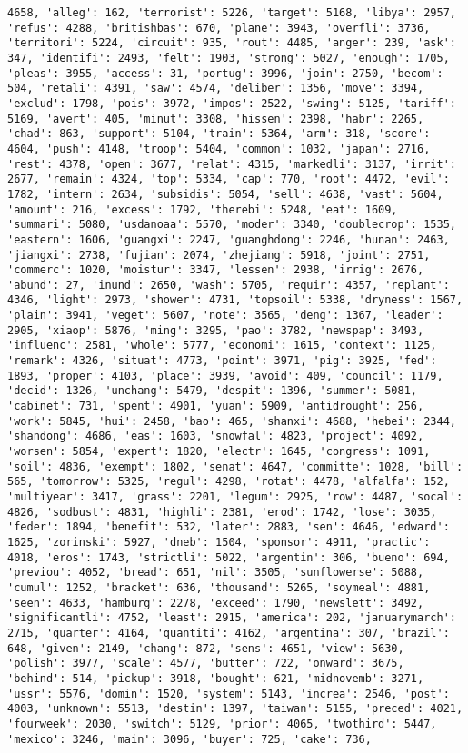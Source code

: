 \documentclass[11pt]{article}
\begin{document}
\begin{Verbatim}[commandchars=\\\{\}]
4658, 'alleg': 162, 'terrorist': 5226, 'target': 5168, 'libya': 2957, 'refus': 4288, 'britishbas': 670, 'plane': 3943, 'overfli': 3736, 'territori': 5224, 'circuit': 935, 'rout': 4485, 'anger': 239, 'ask': 347, 'identifi': 2493, 'felt': 1903, 'strong': 5027, 'enough': 1705, 'pleas': 3955, 'access': 31, 'portug': 3996, 'join': 2750, 'becom': 504, 'retali': 4391, 'saw': 4574, 'deliber': 1356, 'move': 3394, 'exclud': 1798, 'pois': 3972, 'impos': 2522, 'swing': 5125, 'tariff': 5169, 'avert': 405, 'minut': 3308, 'hissen': 2398, 'habr': 2265, 'chad': 863, 'support': 5104, 'train': 5364, 'arm': 318, 'score': 4604, 'push': 4148, 'troop': 5404, 'common': 1032, 'japan': 2716, 'rest': 4378, 'open': 3677, 'relat': 4315, 'markedli': 3137, 'irrit': 2677, 'remain': 4324, 'top': 5334, 'cap': 770, 'root': 4472, 'evil': 1782, 'intern': 2634, 'subsidis': 5054, 'sell': 4638, 'vast': 5604, 'amount': 216, 'excess': 1792, 'therebi': 5248, 'eat': 1609, 'summari': 5080, 'usdanoaa': 5570, 'moder': 3340, 'doublecrop': 1535, 'eastern': 1606, 'guangxi': 2247, 'guanghdong': 2246, 'hunan': 2463, 'jiangxi': 2738, 'fujian': 2074, 'zhejiang': 5918, 'joint': 2751, 'commerc': 1020, 'moistur': 3347, 'lessen': 2938, 'irrig': 2676, 'abund': 27, 'inund': 2650, 'wash': 5705, 'requir': 4357, 'replant': 4346, 'light': 2973, 'shower': 4731, 'topsoil': 5338, 'dryness': 1567, 'plain': 3941, 'veget': 5607, 'note': 3565, 'deng': 1367, 'leader': 2905, 'xiaop': 5876, 'ming': 3295, 'pao': 3782, 'newspap': 3493, 'influenc': 2581, 'whole': 5777, 'economi': 1615, 'context': 1125, 'remark': 4326, 'situat': 4773, 'point': 3971, 'pig': 3925, 'fed': 1893, 'proper': 4103, 'place': 3939, 'avoid': 409, 'council': 1179, 'decid': 1326, 'unchang': 5479, 'despit': 1396, 'summer': 5081, 'cabinet': 731, 'spent': 4901, 'yuan': 5909, 'antidrought': 256, 'work': 5845, 'hui': 2458, 'bao': 465, 'shanxi': 4688, 'hebei': 2344, 'shandong': 4686, 'eas': 1603, 'snowfal': 4823, 'project': 4092, 'worsen': 5854, 'expert': 1820, 'electr': 1645, 'congress': 1091, 'soil': 4836, 'exempt': 1802, 'senat': 4647, 'committe': 1028, 'bill': 565, 'tomorrow': 5325, 'regul': 4298, 'rotat': 4478, 'alfalfa': 152, 'multiyear': 3417, 'grass': 2201, 'legum': 2925, 'row': 4487, 'socal': 4826, 'sodbust': 4831, 'highli': 2381, 'erod': 1742, 'lose': 3035, 'feder': 1894, 'benefit': 532, 'later': 2883, 'sen': 4646, 'edward': 1625, 'zorinski': 5927, 'dneb': 1504, 'sponsor': 4911, 'practic': 4018, 'eros': 1743, 'strictli': 5022, 'argentin': 306, 'bueno': 694, 'previou': 4052, 'bread': 651, 'nil': 3505, 'sunflowerse': 5088, 'cumul': 1252, 'bracket': 636, 'thousand': 5265, 'soymeal': 4881, 'seen': 4633, 'hamburg': 2278, 'exceed': 1790, 'newslett': 3492, 'significantli': 4752, 'least': 2915, 'america': 202, 'januarymarch': 2715, 'quarter': 4164, 'quantiti': 4162, 'argentina': 307, 'brazil': 648, 'given': 2149, 'chang': 872, 'sens': 4651, 'view': 5630, 'polish': 3977, 'scale': 4577, 'butter': 722, 'onward': 3675, 'behind': 514, 'pickup': 3918, 'bought': 621, 'midnovemb': 3271, 'ussr': 5576, 'domin': 1520, 'system': 5143, 'increa': 2546, 'post': 4003, 'unknown': 5513, 'destin': 1397, 'taiwan': 5155, 'preced': 4021, 'fourweek': 2030, 'switch': 5129, 'prior': 4065, 'twothird': 5447, 'mexico': 3246, 'main': 3096, 'buyer': 725, 'cake': 736, 
\end{Verbatim}
\end{document}
